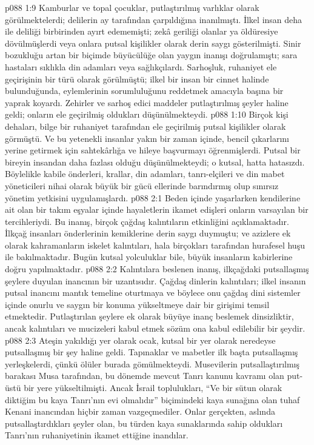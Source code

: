 \vs p088 1:9 Kamburlar ve topal çocuklar, putlaştırılmış varlıklar olarak görülmektelerdi; delilerin ay tarafından çarpıldığına inanılmıştı. İlkel insan deha ile deliliği birbirinden ayırt edememişti; zekâ geriliği olanlar ya öldüresiye dövülmüşlerdi veya onlara putsal kişilikler olarak derin saygı gösterilmişti. Sinir bozukluğu artan bir biçimde büyücülüğe olan yaygın inanışı doğrulamıştı; sara hastaları sıklıkla din adamları veya sağlıkçılardı. Sarhoşluk, ruhaniyet ele geçirişinin bir türü olarak görülmüştü; ilkel bir insan bir cinnet halinde bulunduğunda, eylemlerinin sorumluluğunu reddetmek amacıyla başına bir yaprak koyardı. Zehirler ve sarhoş edici maddeler putlaştırılmış şeyler haline geldi; onların ele geçirilmiş oldukları düşünülmekteydi.
\vs p088 1:10 Birçok kişi dehaları, bilge bir ruhaniyet tarafından ele geçirilmiş putsal kişilikler olarak görmüştü. Ve bu yetenekli insanlar yakın bir zaman içinde, bencil çıkarlarını yerine getirmek için sahtekârlığa ve hileye başvurmayı öğrenmişlerdi. Putsal bir bireyin insandan daha fazlası olduğu düşünülmekteydi; o kutsal, hatta hatasızdı. Böylelikle kabile önderleri, krallar, din adamları, tanrı\hyp{}elçileri ve din mabet yöneticileri nihai olarak büyük bir gücü ellerinde barındırmış olup sınırsız yönetim yetkisini uygulamışlardı.
\vs p088 2:1 Beden içinde yaşarlarken kendilerine ait olan bir takım eşyalar içinde hayaletlerin ikamet edişleri onların varsayılan bir tercihleriydi. Bu inanış, birçok çağdaş kalıntıların etkinliğini açıklamaktadır. İlkçağ insanları önderlerinin kemiklerine derin saygı duymuştu; ve azizlere ek olarak kahramanların iskelet kalıntıları, hala birçokları tarafından hurafesel huşu ile bakılmaktadır. Bugün kutsal yolculuklar bile, büyük insanların kabirlerine doğru yapılmaktadır.
\vs p088 2:2 Kalıntılara beslenen inanış, ilkçağdaki putsallaşmış şeylere duyulan inancının bir uzantısıdır. Çağdaş dinlerin kalıntıları; ilkel insanın putsal inancını mantık temeline oturtmaya ve böylece onu çağdaş dini sistemler içinde onurlu ve saygın bir konuma yükseltmeye dair bir girişimi temsil etmektedir. Putlaştırılan şeylere ek olarak büyüye inanç beslemek dinsizliktir, ancak kalıntıları ve mucizeleri kabul etmek sözüm ona kabul edilebilir bir şeydir.
\vs p088 2:3 Ateşin yakıldığı yer olarak ocak, kutsal bir yer olarak neredeyse putsallaşmış bir şey haline geldi. Tapınaklar ve mabetler ilk başta putsallaşmış yerleşkelerdi, çünkü ölüler burada gömülmekteydi. Musevilerin putsallaştırılmış barakası Musa tarafından, bu dönemde mevcut Tanrı kanunu kavramı olan put\hyp{}üstü bir yere yükseltilmişti. Ancak İsrail toplulukları, “Ve bir sütun olarak diktiğim bu kaya Tanrı’nın evi olmalıdır” biçimindeki kaya sunağına olan tuhaf Kenani inancından hiçbir zaman vazgeçmediler. Onlar gerçekten, aslında putsallaştırdıkları şeyler olan, bu türden kaya sunaklarında sahip oldukları Tanrı’nın ruhaniyetinin ikamet ettiğine inandılar.
